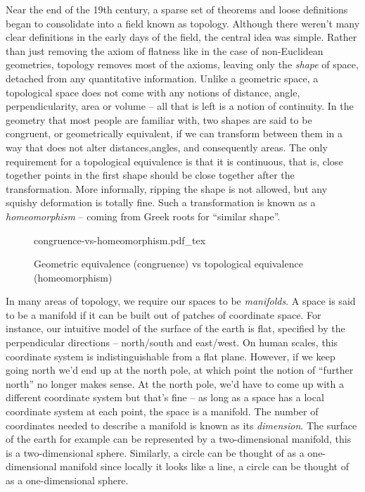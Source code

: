 Near the end of the 19th century, a sparse set of theorems and loose definitions began to consolidate into a field known as topology. Although there weren't many clear definitions in the early days of the field, the central idea was simple. Rather than just removing the axiom of flatness like in the case of non-Euclidean geometries, topology removes most of the axioms, leaving only the \emph{shape} of space, detached from any quantitative information. Unlike a geometric space, a topological space does not come with any notions of distance, angle, perpendicularity, area or volume -- all that is left is a notion of continuity.
In the geometry that most people are familiar with, two shapes are said to be congruent, or geometrically equivalent, if we can transform between them in a way that does not alter distances,angles, and consequently areas.
The only requirement for a topological equivalence is that it is continuous, that is, close together points in the first shape should be close together after the transformation. More informally, ripping the shape is not allowed, but any squishy deformation is totally fine. Such a transformation is known as a \emph{homeomorphism} -- coming from Greek roots for ``similar shape''.
\begin{figure}[ht]
	\centering
	{congruence-vs-homeomorphism.pdf_tex}
	\caption{Geometric equivalence (congruence) vs topological equivalence (homeomorphism)}
\end{figure}

In many areas of topology, we require our spaces to be \emph{manifolds}.
A space is said to be a manifold if it can be built out of patches of coordinate space. For instance, our intuitive model of the surface of the earth is flat, specified by the perpendicular directions -- north/south and east/west. On human scales, this coordinate system is indistinguishable from a flat plane. However, if we keep going north we'd end up at the north pole, at which point the notion of ``further north'' no longer makes sense. At the north pole, we'd have to come up with a different coordinate system but that's fine -- as long as a space has a local coordinate system at each point, the space is a manifold. The number of coordinates needed to describe a manifold is known as its \emph{dimension}. The surface of the earth for example can be represented by a two-dimensional manifold, this is a two-dimensional sphere. Similarly, a circle can be thought of as a one-dimensional manifold since locally it looks like a line, a circle can be thought of as a one-dimensional sphere.


